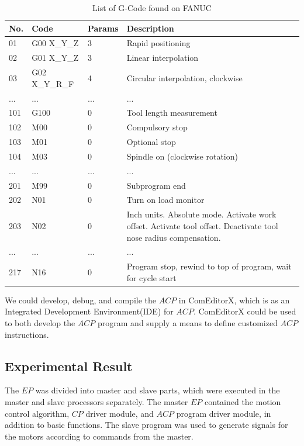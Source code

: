\documentclass[journal]{IEEEtran}
\begin{document}
\begin{table}
	\scriptsize \caption{List of G-Code found on FANUC}
	\label{table:GCODE}
	\begin{center}
		\renewcommand{\arraystretch}{1.4}
		\setlength\tabcolsep{3pt}
		\begin{tabular}{|p{0.3cm}|p{2cm}|p{0.7cm}|p{4cm}|}
			\hline
			No. & Code & Params & Description\\
			\hline
			01  & G00 X\_Y\_Z  & 3 & Rapid positioning \\
			\hline
			02  & G01 X\_Y\_Z & 3 & Linear interpolation\\
			\hline
			03  & G02 X\_Y\_R\_F & 4 & 	Circular interpolation, clockwise \\
			\hline
			...  & ...  & ... & ... \\
			\hline
			101  & G100  & 0 & Tool length measurement \\
			\hline
			102  & M00 & 0 & Compulsory stop \\
			\hline
			103  & M01 & 0 & Optional stop \\
			\hline
			104  & M03 & 0 & Spindle on (clockwise rotation) \\
			\hline
			...  & ... & ... & ... \\
			\hline
			201  & M99 & 0 & Subprogram end \\
			\hline
			202  & N01 & 0 & Turn on load monitor \\
			\hline
			203  & N02 & 0 & Inch units. Absolute mode. Activate work offset. Activate tool offset. Deactivate tool nose radius compensation. \\
			\hline
			... & ... & ... & ...\\
			\hline
			217 & N16 & 0 & Program stop, rewind to top of program, wait for cycle start\\
			\hline
		\end{tabular}
	\end{center}
\end{table}

We could develop, debug, and compile the $ACP$ in ComEditorX, which is as an Integrated Development Environment(IDE) for $ACP$. ComEditorX could be used to both develop the $ACP$ program and supply a means to define customized $ACP$ instructions.


\subsection{Experimental Result}
The $EP$ was divided into master and slave parts, which were executed in the master and slave processors separately. The master $EP$ contained the motion control algorithm, $CP$ driver module, and $ACP$ program driver module, in addition to basic functions. The slave program was used to generate signals for the motors according to commands from the master.
\end{document}
